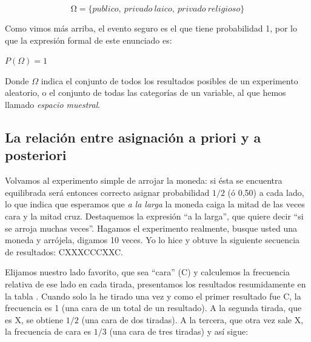 \documentclass[]{book}
\begin{document}
\[\mathrm{\Omega} = \{ publico,\ privado\ laico,\ privado\ religioso\}\]

Como vimos más arriba, el evento seguro es el que tiene probabilidad 1,
por lo que la expresión formal de este enunciado es:

\(P(\Omega) = 1\)

Donde \(\Omega\) indica el conjunto de todos los resultados posibles de un
experimento aleatorio, o el conjunto de todas las categorías de un
variable, al que hemos llamado \emph{espacio muestral}.

\hypertarget{la-relacion-entre-asignacion-a-priori-y-a-posteriori}{%
\subsection{La relación entre asignación a priori y a posteriori}\label{la-relacion-entre-asignacion-a-priori-y-a-posteriori}}

Volvamos al experimento simple de arrojar la moneda: si ésta se
encuentra equilibrada será entonces correcto asignar probabilidad \(1/2\) (ó
0,50) a cada lado, lo que indica que esperamos que \emph{a la larga} la
moneda caiga la mitad de las veces cara y la mitad cruz. Destaquemos la
expresión ``a la larga'', que quiere decir ``si se arroja muchas veces''.
Hagamos el experimento realmente, busque usted una moneda y arrójela,
digamos 10 veces. Yo lo hice y obtuve la siguiente secuencia de
resultados: CXXXCCCXXC.

Elijamos nuestro lado favorito, que sea ``cara'' (C) y calculemos la
frecuencia relativa de ese lado en cada tirada, presentamos los
resultados resumidamente en la tabla . Cuando solo la he tirado una vez
y como el primer resultado fue C, la frecuencia es 1 (una cara de un
total de un resultado). A la segunda tirada, que es X, se obtiene \(1/2\) (una
cara de dos tiradas). A la tercera, que otra vez sale X, la frecuencia
de cara es \(1/3\) (una cara de tres tiradas) y así sigue:
\end{document}
